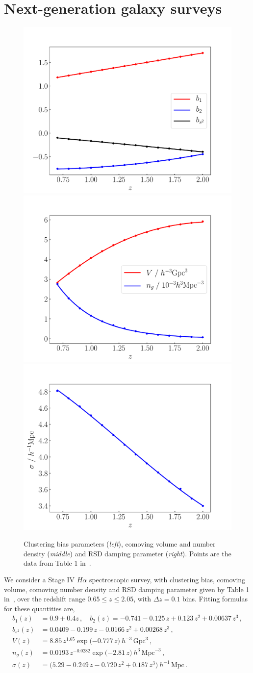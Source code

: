 \section{Next-generation galaxy surveys}
%
\begin{figure}[ht]
\centering
\includegraphics[width=5.cm]{fig/b-eps-converted-to}
\includegraphics[width=5.cm]{fig/V_n-eps-converted-to} 
\includegraphics[width=5.cm]{fig/sigma-eps-converted-to}
\caption{Clustering bias parameters ({\em left}), comoving volume and number density ({\em middle}) and RSD damping parameter ({\em right}). Points are the data from Table 1 in~\cite{Yankelevich:2018uaz}.}
\label{fig1}
\end{figure}
%
We consider a Stage IV $H\alpha$ spectroscopic survey, with clustering bias, comoving volume, comoving number density and RSD damping parameter given by Table 1 in~\cite{Yankelevich:2018uaz}, over the redshift range $0.65\leq z\leq 2.05$, with $\Delta z=0.1$ bins. 
Fitting formulas for these quantities are, 
\begin{align}
b_1(z) &= 0.9+0.4 z\,, \quad b_2(z) = -0.741 - 0.125\,z + 0.123\,z^{2} + 0.00637\,z^{3}\,, \label{e9}  \\
 b_{s^2}(z) &= 0.0409 - 0.199\,z - 0.0166\,z^{2} + 0.00268\,z^{3} \,, \label{e11} \\
 V(z) &= 8.85\, z^{1.65}\exp\big({-0.777\,z}\big)~ h^{-3}\,\mathrm{Gpc}^{3}\,, \label{e11_1} \\
n_{g}(z) &= 0.0193\, z^{-0.0282}\exp\big({-2.81\,z}\big) ~h^{3}\,\mathrm{Mpc}^{-3}\,,
 \label{e11_2}\\
\sigma(z)& = \big(5.29 - 0.249\,z - 0.720\,z^{2} + 0.187\,z^{3}\big)~h^{-1}\,\mathrm{Mpc}\,. \label{e14a}
\end{align}
